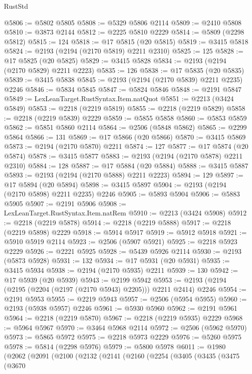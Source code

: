 \begin{lexlean}{RustStd}
\begin{coremodule}
{\begin{coremodule}
{{{{{{{{{{{{{{{{{{{{{{{{{{@5806 := @5802 @5805
@5808 := @5329 @5806 @2114
@5809 := @2410 @5808
@5810 := @3873 @2144
@5812 := @2225 @5810 @2229
@5814 := @5809 (@2298 @5812)
@5815 := 124
@5818 := @17 @5815 (@20 @5815)
@5819 := @3415 @5818
@5824 := @2193 (@2194 (@2170 @5819) @2211 @2310)
@5825 := 125
@5828 := @17 @5825 (@20 @5825)
@5829 := @3415 @5828
@5834 := @2193 (@2194 (@2170 @5829) @2211 @2223)
@5835 := 126
@5838 := @17 @5835 (@20 @5835)
@5839 := @3415 @5838
@5845 := @2193 (@2194 (@2170 @5839) @2211 @2235) @2246
@5846 := @5834 @5845
@5847 := @5824 @5846
@5848 := @2191 @5847
@5849 := LexLeanTarget.RustSyntax.Item.natQuot
@5851 := @2213 (@3424 @5849)
@5853 := @2218 (@2219 @5819)
@5855 := @2218 (@2219 @5829)
@5858 := @2218 (@2219 @5839) @2229
@5859 := @5855 @5858
@5860 := @5853 @5859
@5862 := @5851 @5860 @2114
@5864 := @2506 (@5848 @5862)
@5865 := @2299 @5864
@5866 := 131
@5869 := @17 @5866 (@20 @5866)
@5870 := @3415 @5869
@5873 := @2194 (@2170 @5870) @2211
@5874 := 127
@5877 := @17 @5874 (@20 @5874)
@5878 := @3415 @5877
@5883 := @2193 (@2194 (@2170 @5878) @2211 @2310)
@5884 := 128
@5887 := @17 @5884 (@20 @5884)
@5888 := @3415 @5887
@5893 := @2193 (@2194 (@2170 @5888) @2211 @2223)
@5894 := 129
@5897 := @17 @5894 (@20 @5894)
@5898 := @3415 @5897
@5904 := @2193 (@2194 (@2170 @5898) @2211 @2235) @2246
@5905 := @5893 @5904
@5906 := @5883 @5905
@5907 := @2191 @5906
@5908 := LexLeanTarget.RustSyntax.Item.natRem
@5910 := @2213 (@3424 @5908)
@5912 := @2218 (@2219 @5878)
@5914 := @2218 (@2219 @5888)
@5917 := @2218 (@2219 @5898) @2229
@5918 := @5914 @5917
@5919 := @5912 @5918
@5921 := @5910 @5919 @2114
@5923 := @2506 (@5907 @5921)
@5925 := @2218 @5923 @2229
@5926 := @2221 @5925
@5928 := @5439 @5926 @2114
@5930 := @2193 (@5873 @5928)
@5931 := 132
@5934 := @17 @5931 (@20 @5931)
@5935 := @3415 @5934
@5938 := @2194 (@2170 @5935) @2211
@5939 := 130
@5942 := @17 @5939 (@20 @5939)
@5943 := @2199 @5942
@5953 := @2193 (@2194 (@2195 (@2204 (@2197 (@2170 @5943) @2205))) @2211 @2414) @2246
@5954 := @2191 @5953
@5955 := @2219 @5943
@5957 := @2506 (@5954 @5955)
@5960 := @2193 (@5938 @5957) @2246
@5961 := @5930 @5960
@5962 := @2191 @5961
@5964 := @2218 (@2219 @5870)
@5967 := @2218 (@2219 @5935) @2229
@5968 := @5964 @5967
@5970 := @3464 @5968 @2114
@5972 := @2506 (@5962 @5970)
@5973 := @5865 @5972
@5975 := @2218 @5973 @2229
@5976 := @5260 @5975
@5978 := @5814 (@2298 @5976)
@5979 := @5800 @5978
@6011 := @1980
    (@2062
      (@2091
        (@2100
          (@2132
            (@2141
              (@2160
                (@2254
                  (@3405
                    (@3435
                      (@3475
                        (@3670
}}}}}}}}}}}}}}}}}}}}}}}}}}
\end{coremodule}}
\end{coremodule}
\end{lexlean}
